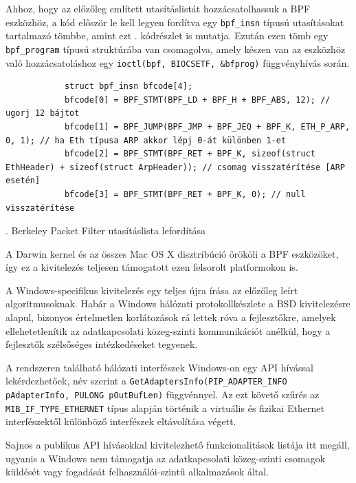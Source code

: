	Ahhoz, hogy az előzőleg említett utasításlistát hozzácsatolhassuk a BPF eszközhöz, a kód először le kell legyen fordítva egy \texttt{bpf_insn} típusú utasításokat tartalmazó tömbbe, amint ezt \az{\ref{bpfcpp}}. kódrészlet is mutatja. Ezután ezen tömb egy \texttt{bpf_program} típusú struktúrába van csomagolva, amely készen van az eszközhöz való hozzácsatoláshoz egy \texttt{ioctl(bpf, BIOCSETF, &bfprog)} függvényhívás során.
	
	\begin{listing}[H]
		\begin{verbatim}
			struct bpf_insn bfcode[4];
			bfcode[0] = BPF_STMT(BPF_LD + BPF_H + BPF_ABS, 12); // ugorj 12 bájtot
			bfcode[1] = BPF_JUMP(BPF_JMP + BPF_JEQ + BPF_K, ETH_P_ARP, 0, 1); // ha Eth típusa ARP akkor lépj 0-át különben 1-et
			bfcode[2] = BPF_STMT(BPF_RET + BPF_K, sizeof(struct EthHeader) + sizeof(struct ArpHeader)); // csomag visszatérítése [ARP esetén]
			bfcode[3] = BPF_STMT(BPF_RET + BPF_K, 0); // null visszatérítése
		\end{verbatim}
		\caption{\Az{\ref{bpfasm}}. Berkeley Packet Filter utasításlista lefordítása}
		\label{bpfcpp}
	\end{listing}
	
	A Darwin kernel és az összes Mac OS X disztribúció örököli a BPF eszközöket, így ez a kivitelezés teljesen támogatott ezen felsorolt platformokon is.


	A Windows-specifikus kivitelezés egy teljes újra írása az előzőleg leírt algoritmusoknak. Habár a Windows hálózati protokollkészlete a BSD kivitelezésre alapul, bizonyos értelmetlen korlátozások rá lettek róva a fejlesztőkre, amelyek ellehetetlenítik az adatkapcsolati közeg-szinti kommunikációt anélkül, hogy a fejlesztők szélsőséges intézkedéseket tegyenek.
	
	A rendszeren található hálózati interfészek Windows-on egy API hívással lekérdezhetőek, név szerint a \texttt{GetAdaptersInfo(PIP_ADAPTER_INFO pAdapterInfo, PULONG pOutBufLen)} függvénnyel. Az ezt követő szűrés az \texttt{MIB_IF_TYPE_ETHERNET} típus alapján történik a virtuális és fizikai Ethernet interfészektől különböző interfészek eltávolítása végett.
	
	Sajnos a publikus API hívásokkal kivitelezhető funkcionalitások listája itt megáll, ugyanis a Windows nem támogatja az adatkapcsolati közeg-szinti csomagok küldését vagy fogadását felhasználói-szintű alkalmazások által.
	
